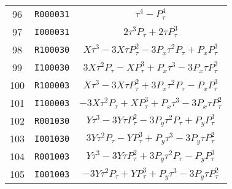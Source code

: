 {{\begin{center}
\begin{tabular}{ccc}
   96&{\tt R000031}&${\tau}^{4}-P_{\tau}^{4}$\\
   97&{\tt I000031}&$2{\tau}^{3}P_{\tau}+2{\tau}P_{\tau}^{3}$\\
   98&{\tt R100030}&$X{\tau}^{3}-3X{\tau}P_{\tau}^{2}-3P_x{\tau}^{2}P_{\tau}+P_xP_{\tau}^{3}$\\
   99&{\tt I100030}&$3X{\tau}^{2}P_{\tau}-XP_{\tau}^{3}+P_x{\tau}^{3}-3P_x{\tau}P_{\tau}^{2}$\\
  100&{\tt R100003}&$X{\tau}^{3}-3X{\tau}P_{\tau}^{2}+3P_x{\tau}^{2}P_{\tau}-P_xP_{\tau}^{3}$\\
  101&{\tt I100003}&$-3X{\tau}^{2}P_{\tau}+XP_{\tau}^{3}+P_x{\tau}^{3}-3P_x{\tau}P_{\tau}^{2}$\\
  102&{\tt R001030}&$Y{\tau}^{3}-3Y{\tau}P_{\tau}^{2}-3P_y{\tau}^{2}P_{\tau}+P_yP_{\tau}^{3}$\\
  103&{\tt I001030}&$3Y{\tau}^{2}P_{\tau}-YP_{\tau}^{3}+P_y{\tau}^{3}-3P_y{\tau}P_{\tau}^{2}$\\
  104&{\tt R001003}&$Y{\tau}^{3}-3Y{\tau}P_{\tau}^{2}+3P_y{\tau}^{2}P_{\tau}-P_yP_{\tau}^{3}$\\
  105&{\tt I001003}&$-3Y{\tau}^{2}P_{\tau}+YP_{\tau}^{3}+P_y{\tau}^{3}-3P_y{\tau}P_{\tau}^{2}$
\end{tabular}



\end{center}}}
